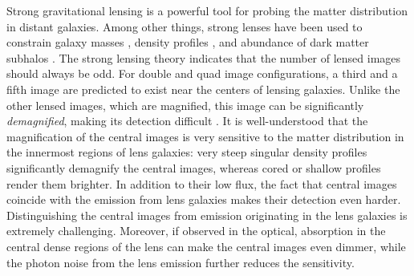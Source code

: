 \documentclass[chicago]{emulateapj}
\begin{document}
Strong gravitational lensing is a powerful tool for probing the matter distribution in distant galaxies. Among other things, strong lenses have been used to constrain galaxy masses  \citep[e.g.][]{}, density profiles \citep[e.g.][]{}, and abundance of dark matter subhalos \citep[e.g.][]{}.
The strong lensing theory indicates that the number of lensed images should always be odd. For double and quad image configurations, a third and a fifth image are predicted to exist near the centers of lensing galaxies. Unlike the other lensed images, which are magnified, this image can be significantly \emph{demagnified}, making its detection difficult \citep{}.  It is well-understood that the magnification of the central images is very sensitive to the matter distribution in the innermost regions of lens galaxies: very steep singular density profiles significantly demagnify the central images, whereas cored or shallow profiles render them brighter. %
In addition to their low flux, the fact that central images coincide with the emission from lens galaxies makes their detection even harder. Distinguishing the central images from emission originating in the lens galaxies is extremely challenging.
Moreover, if observed in the optical, absorption in the central dense regions of the lens can make the central images even dimmer, while the photon noise from the lens emission further reduces the sensitivity. 




\end{document}
